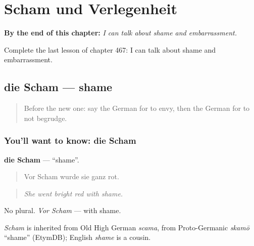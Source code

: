 
\chapter{Scham und Verlegenheit}
\label{ch:ge-scham-und-verlegenheit}

\begin{chapteropening}
\textbf{By the end of this chapter:} \emph{I can talk about shame and embarrassment.}

Complete the last lesson of chapter 467: I can talk about shame and embarrassment.
\end{chapteropening}

\section[die Scham]{die Scham — shame}

\label{lesson:GE-C467-scham}



\begin{quote}
Before the new one: say the German for to envy, then the German for to not begrudge.
\end{quote}

\subsection*{You'll want to know: die Scham}
\textbf{die Scham} — \textquotedblleft{}shame\textquotedblright{}.

\begin{quote}
Vor Scham wurde sie ganz rot.
\end{quote}

\begin{quote}
\emph{She went bright red with shame.}
\end{quote}

No plural. \emph{Vor Scham} — with shame.

\begin{cousinweb}
\emph{Scham} is inherited from Old High German \emph{scama}, from Proto-Germanic \emph{skamō} \textquotedblleft{}shame\textquotedblright{} (EtymDB); English \emph{shame} is a cousin.
\end{cousinweb}

